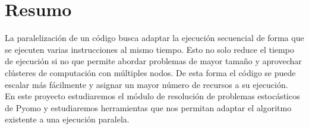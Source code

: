 \pagestyle{plain}
\chapter*{Resumo}

La paralelización de un código busca adaptar la ejecución secuencial de forma que se ejecuten varias instrucciones al mismo tiempo. Esto no solo reduce el tiempo de ejecución si no que permite abordar problemas de mayor tamaño y aprovechar clústeres de computación con múltiples nodos. De esta forma el código se puede escalar más fácilmente y asignar un mayor número de recursos a su ejecución.\\

En este proyecto estudiaremos el módulo de resolución de problemas estocásticos de Pyomo y estudiaremos herramientas que nos permitan adaptar el algoritmo existente a una ejecución paralela.


